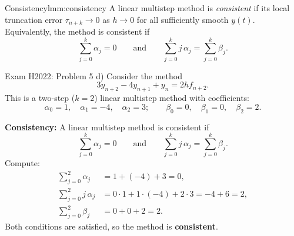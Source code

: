 \begin{definition}{Consistency}{lmm:consistency}
  A linear multistep method is \emph{consistent} if its local truncation error $\tau_{n+k} \to 0$ as $h \to 0$ for all sufficiently smooth $y(t)$.
  Equivalently, the method is consistent if
  \[
    \sum_{j=0}^{k} \alpha_j = 0
    \qquad \text{and} \qquad
    \sum_{j=0}^{k} j\,\alpha_j = \sum_{j=0}^{k} \beta_j.
  \]
\end{definition}

\begin{example}{Exam H2022: Problem 5 d)}{}
  Consider the method
  \[
    3y_{n+2} - 4y_{n+1} + y_n = 2h f_{n+2}.
  \]
  This is a two-step ($k=2$) linear multistep method with coefficients:
  \[
    \alpha_0 = 1,\quad \alpha_1 = -4,\quad \alpha_2 = 3;\qquad
    \beta_0 = 0,\quad \beta_1 = 0,\quad \beta_2 = 2.
  \]

  \textbf{Consistency:}
  A linear multistep method is consistent if
  \[
    \sum_{j=0}^k \alpha_j = 0
    \qquad \text{and} \qquad
    \sum_{j=0}^k j\,\alpha_j = \sum_{j=0}^k \beta_j.
  \]
  Compute:
  \begin{align*}
    \sum_{j=0}^2 \alpha_j    & = 1 + (-4) + 3 = 0,                            \\
    \sum_{j=0}^2 j\,\alpha_j & = 0\cdot1 + 1\cdot(-4) + 2\cdot3 = -4 + 6 = 2, \\
    \sum_{j=0}^2 \beta_j     & = 0 + 0 + 2 = 2.
  \end{align*}
  Both conditions are satisfied, so the method is \textbf{consistent}.


\end{example}
